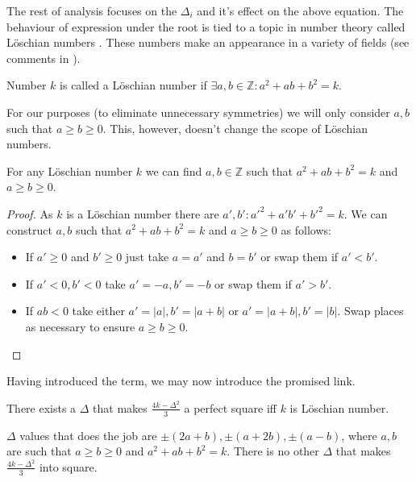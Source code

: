 The rest of analysis focuses on the $\Delta_i$ and it's effect on the above equation. The behaviour of expression under the root is tied to a topic in number theory called Löschian numbers \cite{oeisA003136}. These numbers make an appearance in a variety of fields (see comments in \cite{oeisA003136}).

\begin{definition}
    \label{v3:def:loeshian}
    Number $k$ is called a Löschian number if $\exists a,b \in \mathbb Z \colon a^2+ab+b^2=k$.
\end{definition}

For our purposes (to eliminate unnecessary symmetries) we will only consider $a,b$ such that $a \geq b \geq 0$. This, however, doesn't change the scope of Löschian numbers.

\begin{lemma}
    \label{v3:lemma:loeschian}
    For any Löschian number $k$ we can find $a,b \in \mathbb Z$ such that $a^2+ab+b^2=k$ and $a \geq b \geq 0$.
\end{lemma}

\begin{proof}
    As $k$ is a Löschian number there are $a',b' \colon a'^2+a'b'+b'^2=k$. We can construct $a,b$ such that $a^2+ab+b^2=k$ and $a \geq b \geq 0$ as follows:
    \begin{itemize}
        \item If $a' \geq 0$ and $b' \geq 0$ just take $a=a'$ and $b=b'$ or swap them if $a'<b'$.
        \item If $a'<0,b'<0$ take $a'=-a,b'=-b$ or swap them if $a'>b'$.
        \item If $ab<0$ take either $a'=|a|, b'=|a+b|$ or $a'=|a+b|, b'=|b|$. Swap places as necessary to ensure $a \geq b \geq 0$.
    \end{itemize}
\end{proof}

Having introduced the term, we may now introduce the promised link.

\begin{lemma}
    \label{v3:lemma:square}
    There exists a $\Delta$ that makes $\frac{4k-\Delta^2}{3}$ a perfect square iff $k$ is Löschian number.
    
    $\Delta$ values that does the job are $\pm (2a+b), \pm (a+2b), \pm (a-b)$, where $a,b$ are such that $a \geq b \geq 0$ and $a^2+ab+b^2=k$. There is no other $\Delta$ that makes $\frac{4k-\Delta^2}{3}$ into square.
\end{lemma}

